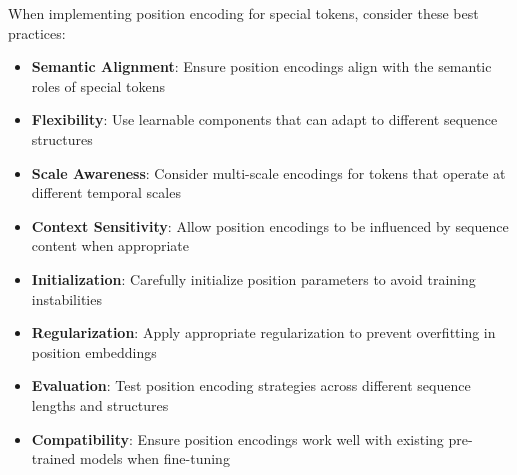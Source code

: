 When implementing position encoding for special tokens, consider these best practices:

\begin{itemize}
\item \textbf{Semantic Alignment}: Ensure position encodings align with the semantic roles of special tokens
\item \textbf{Flexibility}: Use learnable components that can adapt to different sequence structures
\item \textbf{Scale Awareness}: Consider multi-scale encodings for tokens that operate at different temporal scales
\item \textbf{Context Sensitivity}: Allow position encodings to be influenced by sequence content when appropriate
\item \textbf{Initialization}: Carefully initialize position parameters to avoid training instabilities
\item \textbf{Regularization}: Apply appropriate regularization to prevent overfitting in position embeddings
\item \textbf{Evaluation}: Test position encoding strategies across different sequence lengths and structures
\item \textbf{Compatibility}: Ensure position encodings work well with existing pre-trained models when fine-tuning
\end{itemize}
\begin{comment}
Feedback: This is a good list. To make it more actionable:
1.  **Semantic Alignment**: "For a global token like [CLS], assign it a fixed position (e.g., 0) so the model can learn a consistent representation for it. For boundary tokens like [SEP], consider using a 'type-based' embedding that is independent of its absolute position."
2.  **Flexibility**: "If your task involves sequences of varying lengths and complex structures, relative position embeddings are often a more robust and flexible choice than learned absolute position embeddings, which can struggle to generalize to lengths not seen during training."
3.  **Compatibility**: "When fine-tuning a pre-trained model, be aware that its position embeddings are also pre-trained. If you insert new special tokens in the middle of the sequence, you must handle the resulting shift in position indices for all subsequent tokens to avoid providing incorrect positional information to the model."
\end{comment}